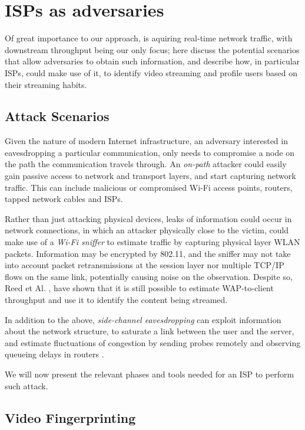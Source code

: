 \chapter{ISPs as adversaries}\label{sec:attack_isp}

Of great importance to our approach, is aquiring real-time network traffic,
with downstream throughput being our only focus; here discuss the potential
scenarios that allow adversaries to obtain such information, and describe how,
in particular ISPs, could make use of it, to identify video streaming and
profile users based on their streaming habits.

\section{Attack Scenarios}\label{attack_scenarios}

Given the nature of modern Internet infrastructure, an adversary interested in
eavesdropping a particular communication, only needs to compromise a node on
the path the communication travels through. An \emph{on-path} attacker could
easily gain passive access to network and transport layers, and start capturing
network traffic. This can include malicious or compromised Wi-Fi access
points, routers, tapped network cables and ISPs. 

Rather than just attacking physical devices, leaks of information could occur
in network connections, in which an attacker physically close to the victim,
could make use of a \emph{Wi-Fi sniffer} to estimate traffic by capturing
physical layer WLAN packets.  Information may be encrypted by 802.11, and the
sniffer may not take into account packet retransmissions at the session layer
nor multiple TCP/IP flows on the same link, potentially causing noise on the
observation. Despite so, Reed et Al. \cite{leaky_streams}, have shown that it
is still possible to estimate WAP-to-client throughput and use it to identify
the content being streamed.

In addition to the above, \emph{side-channel eavesdropping} can exploit
information about the network structure, to saturate a link between the user
and the server, and estimate fluctuations of congestion by sending probes
remotely and observing queueing delays in routers \cite{side_channel}. 

We will now present the relevant phases and tools needed for an ISP to perform
such attack.

\section{Video Fingerprinting}

